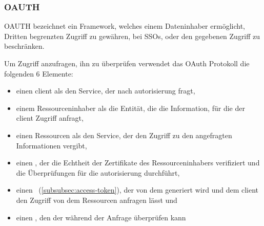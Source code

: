 \subsubsection[OAuth]{\acf{OAUTH}}\label{subsubsec:oauth}
\ac{OAUTH} bezeichnet ein Framework, welches einem Dateninhaber ermöglicht, Dritten begrenzten Zugriff zu gewähren, \zb bei \acp{SSO}, oder den gegebenen Zugriff zu beschränken.\autocites[\vglf][]{rfc6749}[\vglf][]{OAuthWebProtocol:2012}

Um Zugriff anzufragen, \bzw ihn zu überprüfen\autocite[\vglf][]{OAuthWebProtocol:2012} verwendet das OAuth Protokoll die folgenden 6 Elemente:
\begin{itemize}
    \item einen \gls{client} als den Service, der nach \gls{autorisierung} fragt,
    \item einem Ressourceninhaber als die Entität, die die Information, für die der \gls{client} Zugriff anfragt,
    \item einen Ressourcen als den Service, der den Zugriff zu den angefragten Informationen vergibt,
    \item einen , der die Echtheit der Zertifikate des Ressourceninhabers verifiziert und die Überprüfungen für die \gls{autorisierung} durchführt,
    \item einen\  (\autoref{subsubsec:access-token}), der von dem  generiert wird und dem \gls{client} den Zugriff von dem Ressourcen anfragen lässt und
    \item einen , den der  während der Anfrage überprüfen kann
\end{itemize}

